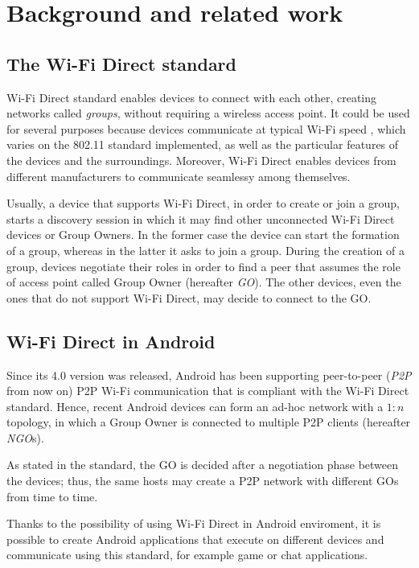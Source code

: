 \section{Background and related work} %
\subsection{The Wi-Fi Direct standard}
Wi-Fi Direct standard enables devices to connect with each other, creating 
networks called \textit{groups}, without requiring a wireless access point. It
could be used for several purposes because devices communicate at typical Wi-Fi
speed \cite{bib:wifiP2pspec}, which varies on the 802.11 standard implemented,
as well as the particular features of the devices and the surroundings.
Moreover, Wi-Fi Direct enables devices from different manufacturers to
communicate seamlessy among themselves.

Usually, a device that supports Wi-Fi Direct, in order to create or join a
group, starts a discovery session in which it may find other unconnected Wi-Fi
Direct devices or Group Owners.
In the former case the device can start the formation of a group, whereas in
the latter it asks to join a group.
During the creation of a group,
devices negotiate their roles in order to find a peer that assumes the role of 
access point called Group Owner (hereafter \textit{GO}). The other devices,
even the ones that do not support Wi-Fi Direct, may decide to connect to the
GO.

\subsection{Wi-Fi Direct in Android}
Since its 4.0 version was released, Android has been supporting peer-to-peer 
(\textit{P2P} from now on) P2P Wi-Fi communication that is compliant with the 
Wi-Fi Direct standard\cite{bib:wifiP2pspec}. 
Hence, recent Android devices can form an ad-hoc network with a $1:n$ topology,
in which a Group Owner is connected to multiple P2P clients (hereafter \textit{NGO}s).

As stated in the standard, the GO is decided after a negotiation phase between
the devices; thus, the same hosts may create a P2P network with different GOs
from time to time.

Thanks to the possibility of using Wi-Fi Direct in Android enviroment, it is 
possible to create Android applications that execute on different devices and 
communicate using this standard, for example game or chat applications. 

